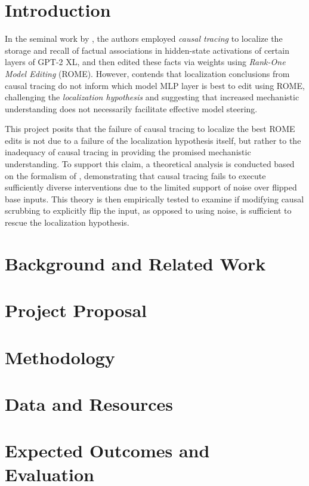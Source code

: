\documentclass{article}
\begin{document}
\section{Introduction}

In the seminal work by \citet{meng2022locating}, the authors employed \emph{causal tracing} to localize the storage and recall of factual associations in hidden-state activations of certain layers of GPT-2 XL, and then edited these facts via weights using \emph{Rank-One Model Editing} (ROME). However, \citet{hase2023does} contends that localization conclusions from causal tracing do not inform which model MLP layer is best to edit using ROME, challenging the \emph{localization hypothesis} and suggesting that increased mechanistic understanding does not necessarily facilitate effective model steering. 

This project posits that the failure of causal tracing to localize the best ROME edits is not due to a failure of the localization hypothesis itself, but rather to the inadequacy of causal tracing in providing the promised mechanistic understanding. To support this claim, a theoretical analysis is conducted based on the formalism of \cite{reber2023whatsyourusecase}, demonstrating that causal tracing fails to execute sufficiently diverse interventions due to the limited support of noise over flipped base inputs. This theory is then empirically tested to examine if modifying causal scrubbing to explicitly flip the input, as opposed to using noise, is sufficient to rescue the localization hypothesis.

\section{Background and Related Work}

\section{Project Proposal}

\section{Methodology}

\section{Data and Resources}

\section{Expected Outcomes and Evaluation}
\end{document}
